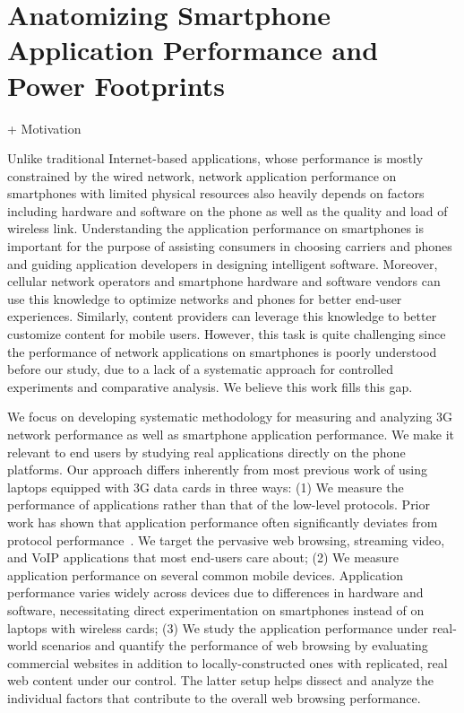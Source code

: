 \chapter{Anatomizing Smartphone Application Performance and Power Footprints} \label{chap:app}

	+ Motivation
	
Unlike traditional Internet-based applications, whose performance is mostly constrained by the wired network, network application performance on smartphones with limited physical resources also heavily depends on factors including hardware and software on the 
phone as well as the quality and load of wireless link. Understanding 
the application performance on smartphones is important for the 
purpose of assisting consumers in choosing carriers and phones and 
guiding application developers in designing intelligent software. 
Moreover, cellular network operators and smartphone hardware and 
software vendors can use this knowledge to optimize networks and 
phones for better end-user experiences. Similarly, content providers 
can leverage this knowledge to better customize content for mobile 
users. However, this task is quite challenging since the performance 
of network applications on smartphones is poorly understood before our study, due to a lack of a systematic approach for controlled experiments 
and comparative analysis. We believe this work fills this gap.

We focus on developing systematic methodology for measuring and
analyzing 3G network performance as well as smartphone application
performance. We make it relevant to end users by studying real
applications directly on the phone platforms. Our approach differs 
inherently from most previous work of using laptops equipped with 
3G data cards in three ways: (1) We measure the performance of 
applications rather than that of the low-level protocols. Prior 
work has shown that application performance often significantly 
deviates from protocol performance~\cite{Zhuang:A3:Mobicom2006}. 
We target the pervasive web browsing, streaming video, and VoIP
applications that most end-users care about; (2) We measure 
application performance on several common mobile devices. 
Application performance varies widely across devices due to 
differences in hardware and software, necessitating direct 
experimentation on smartphones instead of on laptops with wireless 
cards; (3) We study the application performance under real-world 
scenarios and quantify the performance of web browsing by 
evaluating commercial websites in addition to locally-constructed 
ones with replicated, real web content under our control. The 
latter setup helps dissect and analyze the individual factors 
that contribute to the overall web browsing performance.


